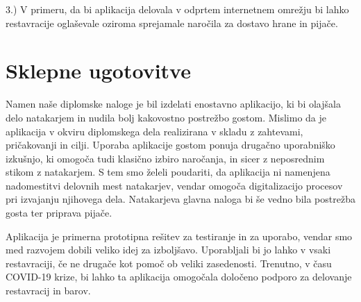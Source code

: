 \documentclass[a4paper, 12pt]{book}
\begin{document}
3.) V primeru, da bi aplikacija delovala v odprtem internetnem omrežju bi lahko restavracije oglaševale oziroma sprejamale naročila za dostavo hrane in pijače.


\chapter {Sklepne ugotovitve}
Namen naše diplomske naloge je bil izdelati enostavno aplikacijo, ki bi olajšala delo natakarjem in nudila bolj kakovostno postrežbo gostom. Mislimo da je aplikacija v okviru diplomskega dela realizirana v skladu z zahtevami, pričakovanji in cilji. Uporaba aplikacije gostom ponuja drugačno uporabniško izkušnjo, ki omogoča tudi klasično izbiro naročanja, in sicer z neposrednim stikom z natakarjem. S tem smo želeli poudariti, da aplikacija ni namenjena nadomestitvi delovnih mest natakarjev, vendar omogoča digitalizacijo procesov pri izvajanju njihovega dela. Natakarjeva glavna naloga bi še vedno bila postrežba gosta ter priprava pijače. 

Aplikacija je primerna prototipna rešitev za testiranje in za uporabo, vendar smo med razvojem dobili veliko idej za izboljšavo. Uporabljali bi jo lahko v vsaki restavraciji, če ne drugače kot pomoč ob veliki zasedenosti. Trenutno, v času COVID-19 krize, bi lahko ta aplikacija omogočala določeno podporo za delovanje restavracij in barov. 


\newpage %
\ \\
\clearpage
{}


\end{document}
